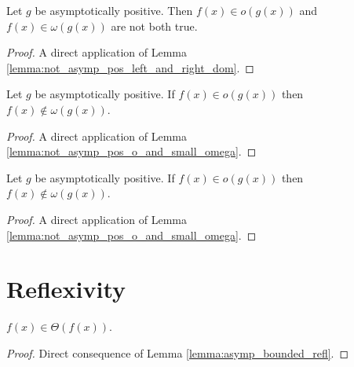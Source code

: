 \begin{lemma}
    \label{lemma:not_asymp_pos_o_and_small_omega}
    \leanok
    Let $g$ be asymptotically positive. Then $f(x) \in o(g(x))$ and 
    $f(x) \in \omega(g(x))$ are not both true.
\end{lemma}

\begin{proof}
    \leanok
    A direct application of Lemma \ref{lemma:not_asymp_pos_left_and_right_dom}.
\end{proof}

\begin{lemma}
    \label{lemma:not_asymp_pos_small_omega_of_o}
    \leanok
    Let $g$ be asymptotically positive. If $f(x) \in o(g(x))$ then $f(x) \notin \omega(g(x))$.
\end{lemma}

\begin{proof}
    \leanok
    A direct application of Lemma \ref{lemma:not_asymp_pos_o_and_small_omega}.
\end{proof}

\begin{lemma}
    \label{lemma:not_asymp_pos_o_of_small_omega}
    \leanok
    Let $g$ be asymptotically positive. If $f(x) \in o(g(x))$ then $f(x) \notin \omega(g(x))$.
\end{lemma}

\begin{proof}
    \leanok
    A direct application of Lemma \ref{lemma:not_asymp_pos_o_and_small_omega}.
\end{proof}


\section{Reflexivity}

\begin{lemma}
    \label{lemma:theta_refl}
    \leanok
    $f(x) \in \Theta(f(x))$.

\end{lemma}

\begin{proof}
    \leanok
    Direct consequence of Lemma \ref{lemma:asymp_bounded_refl}.
\end{proof}

